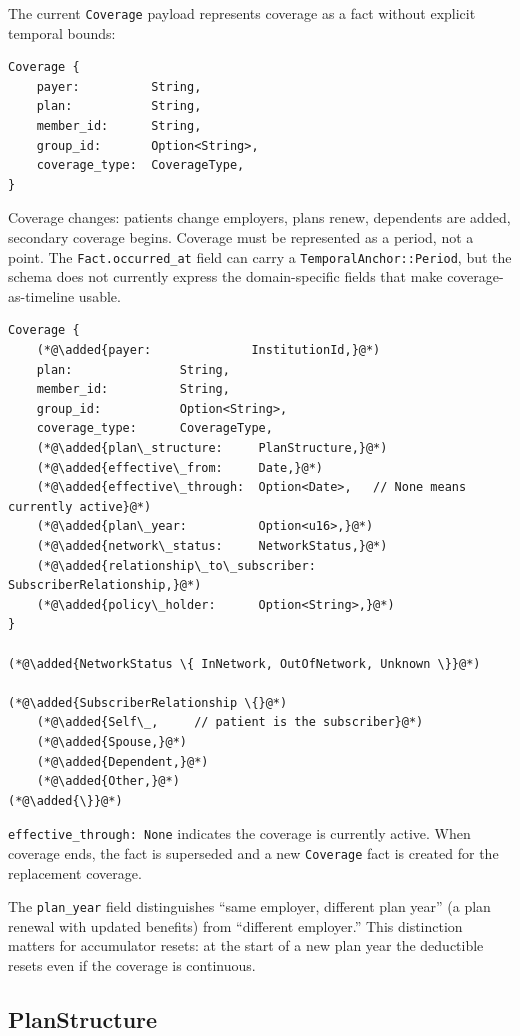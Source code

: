 \documentclass[11pt]{article}
\newcommand{\added}[1]{\textcolor{accentblue}{#1}}
\begin{document}
The current \texttt{Coverage} payload represents coverage as a fact
without explicit temporal bounds:

\begin{lstlisting}
Coverage {
    payer:          String,
    plan:           String,
    member_id:      String,
    group_id:       Option<String>,
    coverage_type:  CoverageType,
}
\end{lstlisting}

Coverage changes: patients change employers, plans renew, dependents are
added, secondary coverage begins. Coverage must be represented as a
period, not a point. The \texttt{Fact.occurred\_at} field can carry a
\texttt{TemporalAnchor::Period}, but the schema does not currently
express the domain-specific fields that make coverage-as-timeline
usable.

\begin{lstlisting}
Coverage {
    (*@\added{payer:              InstitutionId,}@*)
    plan:               String,
    member_id:          String,
    group_id:           Option<String>,
    coverage_type:      CoverageType,
    (*@\added{plan\_structure:     PlanStructure,}@*)
    (*@\added{effective\_from:     Date,}@*)
    (*@\added{effective\_through:  Option<Date>,   // None means currently active}@*)
    (*@\added{plan\_year:          Option<u16>,}@*)
    (*@\added{network\_status:     NetworkStatus,}@*)
    (*@\added{relationship\_to\_subscriber: SubscriberRelationship,}@*)
    (*@\added{policy\_holder:      Option<String>,}@*)
}

(*@\added{NetworkStatus \{ InNetwork, OutOfNetwork, Unknown \}}@*)

(*@\added{SubscriberRelationship \{}@*)
    (*@\added{Self\_,     // patient is the subscriber}@*)
    (*@\added{Spouse,}@*)
    (*@\added{Dependent,}@*)
    (*@\added{Other,}@*)
(*@\added{\}}@*)
\end{lstlisting}

\texttt{effective\_through: None} indicates the coverage is currently
active. When coverage ends, the fact is superseded and a new
\texttt{Coverage} fact is created for the replacement coverage.

The \texttt{plan\_year} field distinguishes ``same employer, different
plan year'' (a plan renewal with updated benefits) from ``different
employer.'' This distinction matters for accumulator resets: at the
start of a new plan year the deductible resets even if the coverage is
continuous.

\subsection{PlanStructure}
\label{sec:plan-structure}
\end{document}
